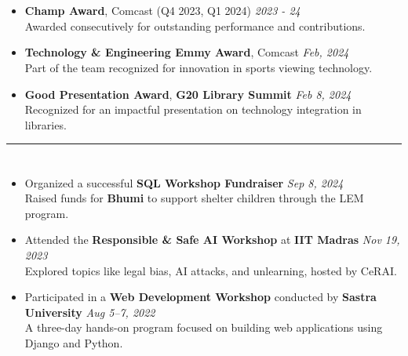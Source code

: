 \documentclass[a4paper,10pt]{article}
\begin{document}
\section{\scshape{}}
\begin{itemize}
    \item \textbf{Champ Award}, Comcast (Q4 2023, Q1 2024) \hfill \textit{2023 - 24}\\
    Awarded consecutively for outstanding performance and contributions.
    \vspace{-2mm}
    \item \textbf{Technology \& Engineering Emmy Award}, Comcast \href{https://corporate.comcast.com/press/releases/comcast-wins-technology-engineering-emmy-innovation-sports-viewing}{} \hfill \textit{Feb, 2024}\\
    Part of the team recognized for innovation in sports viewing technology. 
    \vspace{-2mm}
    \item \textbf{Good Presentation Award}, \textbf{G20 Library Summit} \href{https://www.linkedin.com/posts/a-shreehari_ml-huggingface-g20librarysummit-activity-7163032877201371137-ZS8n?utm_source=share&utm_medium=member_desktop}{} \hfill \textit{Feb 8, 2024}\\
    Recognized for an impactful presentation on technology integration in libraries.
\end{itemize}

\hrule
\section{\scshape\color{Fuchsia}{\faBookOpen \ \textbf WORKSHOPS}}
\begin{itemize}
    \item Organized a successful \textbf{SQL Workshop Fundraiser} \href{https://www.linkedin.com/posts/a-shreehari_fundraiser-sqlworkshop-communitysupport-activity-7239111496339746816-VhVM?utm_source=share&utm_medium=member_desktop}{} \hfill \textit{Sep 8, 2024}\\ Raised funds for \textbf{Bhumi} to support shelter children through the LEM program.
    \vspace{-2mm}
    \item Attended the \textbf{Responsible \& Safe AI Workshop} at \textbf{IIT Madras} \href{https://www.linkedin.com/posts/activity-7132008217424916480-G6g2?utm_source=share&utm_medium=member_desktop}{} \hfill \textit{Nov 19, 2023} \\ 
    Explored topics like legal bias, AI attacks, and unlearning, hosted by CeRAI.
    \vspace{-2mm}
    \item Participated in a \textbf{Web Development Workshop} conducted by \textbf{Sastra University} \hfill \textit{Aug 5–7, 2022} \\
    A three-day hands-on program focused on building web applications using Django and Python.
\end{itemize}
\end{document}
